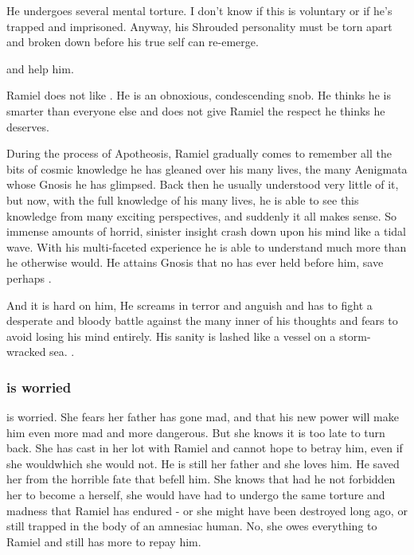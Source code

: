 He undergoes several mental torture. I don't know if this is voluntary or if he's trapped and imprisoned. Anyway, his Shrouded personality must be torn apart and broken down before his true self can re-emerge. 

\Cishiel{} and \Gilchad{} help him. 

Ramiel does not like \Gilchad. 
He is an obnoxious, condescending snob. 
He thinks he is smarter than everyone else and does not give Ramiel the respect he thinks he deserves. 

During the process of Apotheosis, Ramiel gradually comes to remember all the bits of cosmic knowledge he has gleaned over his many lives, the many Aenigmata whose Gnosis he has glimpsed. 
Back then he usually understood very little of it, but now, with the full knowledge of his many lives, he is able to see this knowledge from many exciting perspectives, and suddenly it all makes sense.
So immense amounts of horrid, sinister insight crash down upon his mind like a tidal wave.
With his multi-faceted experience he is able to understand much more than he otherwise would.
He attains Gnosis that no \resphan has ever held before him, save perhaps \Azraid.

And it is hard on him,
He screams in terror and anguish and has to fight a desperate and bloody battle against the many inner \daemons of his thoughts and fears to avoid losing his mind entirely.
His sanity is lashed like a vessel on a storm-wracked sea.
. 





\subsubsection{\Cishiel is worried}
\Cishiel is worried.
She fears her father has gone mad, and that his new power will make him even more mad and more dangerous.
But she knows it is too late to turn back.
She has cast in her lot with Ramiel and cannot hope to betray him, even if she would\prikker which she would not.
He is still her father and she loves him. 
He saved her from the horrible fate that befell him.
She knows that had he not forbidden her to become a \malach herself, she would have had to undergo the same torture and madness that Ramiel has endured - or she might have been destroyed long ago, or still trapped in the body of an amnesiac human.
No, she owes everything to Ramiel and still has more to repay him.

